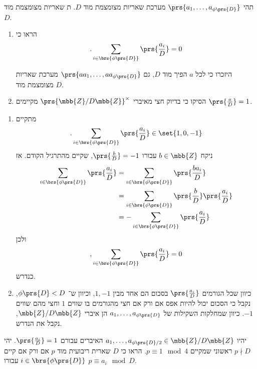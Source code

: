 \documentclass[a4paper,10pt,twoside,openany]{book}
\begin{document}
\begin{exercisechap}
תהי
$\prs{a_1, \ldots, a_{\phi\prs{D}}}$
מערכת שאריות מצומצמת מוד
$D$.
ת שאריות מצומצמת מוד
$D$.

\begin{enumerate}
\item הראו כי
\begin{align*}
\text{.} \sum_{i \in \brs{\phi\prs{D}}} \prs{\frac{a_i}{D}} = 0
\end{align*}

היזכרו כי לכל
$a$
הפיך מוד
$D$, גם
$\prs{a a_1, \ldots, a a_{\phi\prs{D}}}$
מערכת שאריות מצומצמת מוד
$D$.

\item
הסיקו כי בדיוק חצי מאיברי
$\prs{\mbb{Z} / D\mbb{Z}}^\times$
מקיימים
 $\prs{\frac{a}{D}} = 1$.
\end{enumerate}
\end{exercisechap}

\begin{solution}
\begin{enumerate}
\item מתקיים
\begin{align*}
\text{.} \sum_{i \in \brs{\phi\prs{D}}} \prs{\frac{a_i}{D}} \in \set{1, 0, -1}
\end{align*}
ניקח
$b \in \mbb{Z}$
עבורו
$\prs{\frac{b}{D}} = -1$,
שקיים מהתרגיל הקודם.
אז
\begin{align*}
\sum_{i \in \brs{\phi\prs{D}}} \prs{\frac{a_i}{D}} &=
\sum_{i \in \brs{\phi\prs{D}}} \prs{\frac{b a_i}{D}}
\\&=
\sum_{i \in \brs{\phi\prs{D}}} \prs{\frac{b}{D}} \prs{\frac{a_i}{D}}
\\&=
- \sum_{i \in \brs{\phi\prs{D}}} \prs{\frac{a_i}{D}}
\end{align*}
ולכן
\[\text{,} \sum_{i \in \brs{\phi\prs{D}}} \prs{\frac{a_i}{D}} = 0\]
כנדרש.

\item
כיוון שכל הגורמים
$\prs{\frac{a_i}{D}}$
בסכום הם אחד מבין
$1, -1$,
וכיוון ש־%
$\phi\prs{D} < D$,
נקבל כי הסכום יכול להיות אפס אם ורק אם חצי מהגורמים בו שווים
$1$
וחצי מהם שווים
$-1$.
כיוון שמחלקות השקילות של
$a_1, \ldots, a_{\phi\prs{D}}$
הן איברי
$\mbb{Z} / D\mbb{Z}$,
נקבל את הנדרש.
\end{enumerate}
\end{solution}

\begin{exercisechap}
יהיו
$a_1, \ldots, a_{\phi\prs{D} / 2} \in \mbb{Z} / D\mbb{Z}$
האיברים עבורם
$\prs{\frac{a_i}{D}} = 1$.
יהי
$p \nmid D$
ראשוני שמקיים
$p \equiv 1 \mod{4}$.
הראו כי
$D$
שארית ריבועית מוד
$p$
אם ורק אם קיים
$i \in \brs{\phi\prs{D}}$
עבורו
$p \equiv a_i \mod{D}$.
\end{exercisechap}
\end{document}
